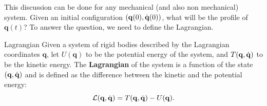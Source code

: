 \documentclass[10pt, a4paper]{report}
\newcommand{\q}{{\mathbf q}}
\begin{document}
This discussion can be done for any mechanical (and also non mechanical) system. Given an initial configuration $(\q(0),\dq(0))$, what will be the profile of $\q(t)$? To answer the question, we need to define the Lagrangian.

\begin{boxdefinition}{Lagrangian}{}
    Given a system of rigid bodies described by the Lagrangian coordinates $\q$, let $U(\q)$ to be the potential energy of the system, and $T(\q,\dq)$ to be the kinetic energy. The \textbf{Lagrangian} of the system is a function of the state $(\q,\dq)$ and is defined as the difference between the kinetic and the potential energy:\begin{equation}
        \mathcal L(\q,\dq)=T(\q,\dq)-U(\q).
    \end{equation}
\end{boxdefinition}
\end{document}
